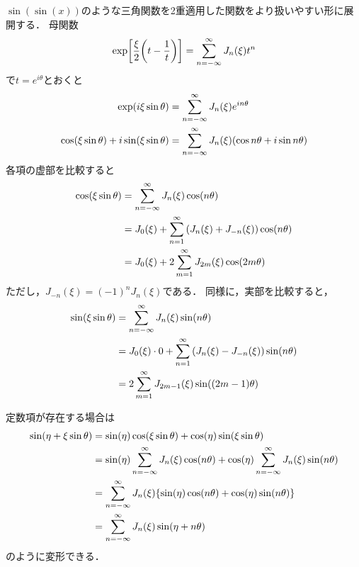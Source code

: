 \documentclass[dvipdfmx,autodetect-engine,12pt,fleqn]{jsarticle}
\begin{document}
$\sin(\sin(x))$のような三角関数を2重適用した関数をより扱いやすい形に展開する．
母関数
\begin{equation*}
    \exp\sbra*{\frac{\xi}{2}\qty(t-\frac{1}{t})} = \sum_{n=-\infty}^\infty J_n(\xi)t^n
\end{equation*}
で$t=e^{i\theta}$とおくと
\begin{equation}
\begin{split}
    \exp\lparen i\xi \sin\theta\rparen &= \sum_{n=-\infty}^\infty J_n(\xi)e^{in\theta}\\
    \cos\lparen\xi \sin\theta\rparen+i\sin\lparen\xi \sin\theta\rparen &= \sum_{n=-\infty}^\infty J_n(\xi)\lparen\cos{n\theta}+i\sin{n\theta}\rparen
\end{split}
\end{equation}
各項の虚部を比較すると
\begin{equation}
\begin{split}
    \cos\rbra*{\xi \sin\theta} &= \sum_{n=-\infty}^\infty J_n(\xi)\cos\rbra{n\theta}\\
    &= J_0(\xi) + \sum_{n=1}^\infty \qty(J_n(\xi)+J_{-n}(\xi))\cos\rbra{n\theta}\\
    &= J_0(\xi) + 2\sum_{m=1}^\infty J_{2m}(\xi)\cos\rbra{2m\theta}
\end{split}
\end{equation}
ただし，$J_{-n}(\xi)=(-1)^nJ_n(\xi)$である．
同様に，実部を比較すると，
\begin{equation}
\begin{split}
    \sin\rbra*{\xi \sin\theta} &= \sum_{n=-\infty}^\infty J_n(\xi)\sin\rbra{n\theta}\\
    &= J_0(\xi)\cdot 0 + \sum_{n=1}^\infty \qty(J_n(\xi)-J_{-n}(\xi))\sin\rbra{n\theta}\\
    &= 2\sum_{m=1}^\infty J_{2m-1}(\xi)\sin\rbra{(2m-1)\theta}
\end{split}
\end{equation}

定数項が存在する場合は
\begin{equation}
\label{eq:bessel-series-sinsin}
\begin{split}
    \sin\rbra*{\eta + \xi \sin\theta} &= \sin(\eta)\cos(\xi\sin\theta)+\cos(\eta)\sin(\xi\sin\theta)\\
    &= \sin(\eta)\sum_{n=-\infty}^\infty J_n(\xi)\cos(n\theta) + \cos(\eta)\sum_{n=-\infty}^\infty J_n(\xi)\sin(n\theta)\\
    &= \sum_{n=-\infty}^\infty J_n(\xi) \qty{\sin(\eta)\cos(n\theta) + \cos(\eta)\sin(n\theta)}\\
    &= \sum_{n=-\infty}^\infty J_n(\xi) \sin\rbra*{\eta + n\theta}
\end{split}
\end{equation}
のように変形できる．
\end{document}
